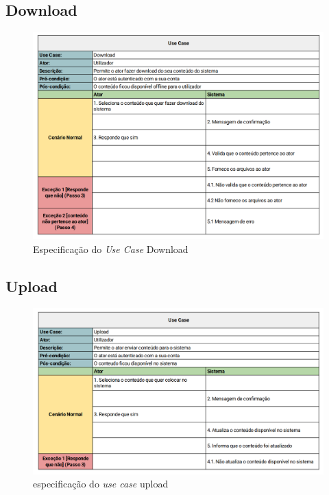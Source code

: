 \documentclass[a4paper]{report}
\begin{document}
\subsection{Download}

\begin{figure}[H]
	\centering 
    \includegraphics[width=\textwidth]{images/Download.png}  
    \caption{Especificação do \emph{Use Case} Download}
\end{figure}

\subsection{Upload}

\begin{figure}[H]
	\centering 
    \includegraphics[width=\textwidth]{images/upload.png}  
    \caption{especificação do \emph{use case} upload}
\end{figure}
\end{document}
